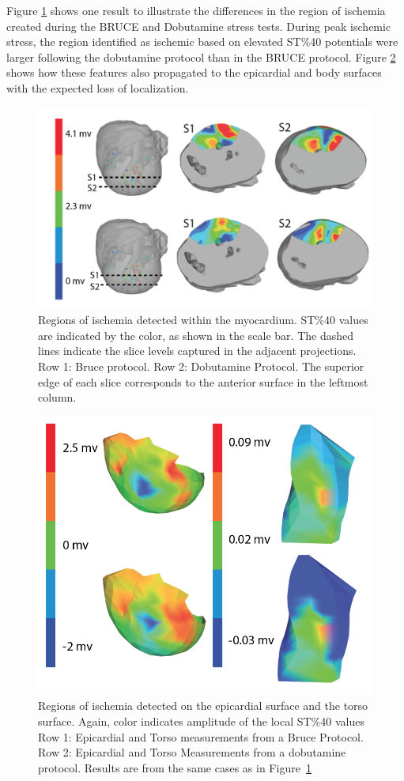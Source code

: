 \documentclass[twocolumn]{cinc}
\begin{document}
Figure \ref{fig:myo} shows one result to illustrate
the differences in the region of ischemia created during the BRUCE and
Dobutamine stress tests. During peak ischemic stress, the region
identified as ischemic based on elevated ST\%40 potentials were
larger following the dobutamine protocol than in the BRUCE protocol. 
Figure \ref{fig:epitorso} shows how these features also
propagated to the epicardial and body surfaces with the expected loss of
localization.


\begin{figure}
	\centering
	\includegraphics[width = .45\textwidth]{../Figures/1.png}
	
	\caption{Regions of ischemia detected within the myocardium. ST\%40 values are indicated by the color, as shown in the scale bar. The dashed lines indicate the slice
          levels captured in the adjacent projections. Row 1: Bruce
          protocol. Row 2: Dobutamine Protocol. The superior edge of each
          slice corresponds to the anterior surface in the leftmost
          column.}
	\label{fig:myo}
\end{figure}

\begin{figure}
	\centering
	\includegraphics[width = .45\textwidth]{../Figures/2.png}

	\caption{Regions of ischemia detected on the epicardial surface and
          the torso surface. Again, color indicates
          amplitude of the local ST\%40 values Row 1: Epicardial and
          Torso measurements from a Bruce Protocol. Row 2: Epicardial and
          Torso Measurements from a dobutamine protocol.  Results are
          from the same cases as in Figure~\ref{fig:myo}}
	\label{fig:epitorso}
\end{figure}
\end{document}
